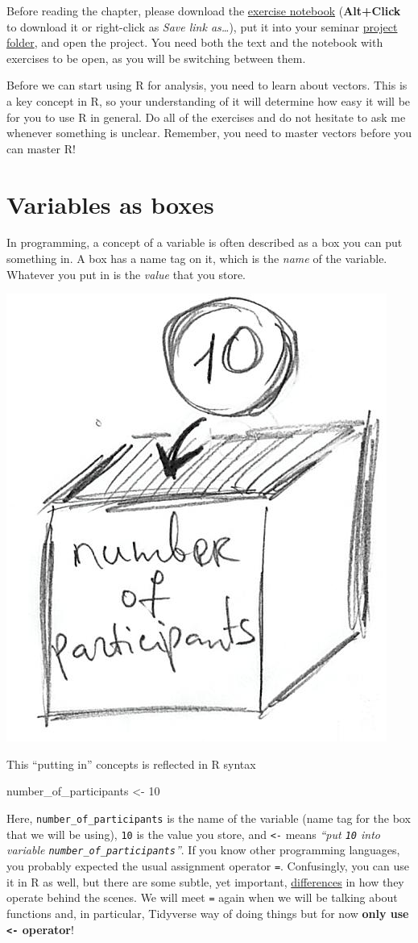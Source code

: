\documentclass[
]{book}
\newenvironment{Shaded}{\begin{snugshade}}{\end{snugshade}}
\newcommand{\DecValTok}[1]{\textcolor[rgb]{0.00,0.00,0.81}{#1}}
\newcommand{\NormalTok}[1]{#1}
\newcommand{\OtherTok}[1]{\textcolor[rgb]{0.56,0.35,0.01}{#1}}
\begin{document}
Before reading the chapter, please download the \href{notebooks/Seminar\%2002\%20-\%20Vectors.Rmd}{exercise notebook} (\textbf{Alt+Click} to download it or right-click as \emph{Save link as\ldots{}}), put it into your seminar \protect\hyperlink{projects}{project folder}, and open the project. You need both the text and the notebook with exercises to be open, as you will be switching between them.

Before we can start using R for analysis, you need to learn about vectors. This is a key concept in R, so your understanding of it will determine how easy it will be for you to use R in general. Do all of the exercises and do not hesitate to ask me whenever something is unclear. Remember, you need to master vectors before you can master R!

\hypertarget{variables}{%
\section{Variables as boxes}\label{variables}}

In programming, a concept of a variable is often described as a box you can put something in. A box has a name tag on it, which is the \emph{name} of the variable. Whatever you put in is the \emph{value} that you store.

\begin{center}\includegraphics[width=0.3\linewidth]{images/variable-as-box} \end{center}

This ``putting in'' concepts is reflected in R syntax

\begin{Shaded}
\begin{Highlighting}[]
\NormalTok{number\_of\_participants }\OtherTok{\textless{}{-}} \DecValTok{10}
\end{Highlighting}
\end{Shaded}

Here, \texttt{number\_of\_participants} is the name of the variable (name tag for the box that we will be using), \texttt{10} is the value you store, and \texttt{\textless{}-} means \emph{``put \texttt{10} into variable \texttt{number\_of\_participants}''}. If you know other programming languages, you probably expected the usual assignment operator \texttt{=}. Confusingly, you can use it in R as well, but there are some subtle, yet important, \href{https://stat.ethz.ch/R-manual/R-devel/library/base/html/assignOps.html}{differences} in how they operate behind the scenes. We will meet \texttt{=} again when we will be talking about functions and, in particular, Tidyverse way of doing things but for now \textbf{only use \texttt{\textless{}-} operator}!
\end{document}
